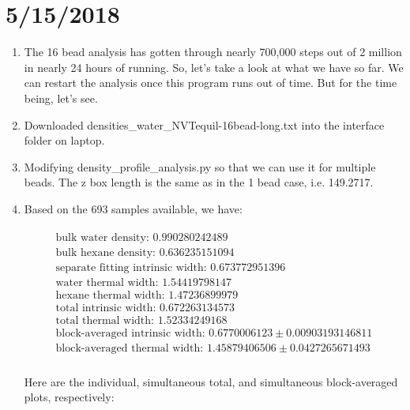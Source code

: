 \documentclass[12pt,reqno]{amsart}
\numberwithin{equation}{section}
\begin{document}
\section{5/15/2018}
\begin{enumerate}
\item The 16 bead analysis has gotten through nearly 700,000 steps out of 2 million in nearly 24 hours of running.  So, let's take a look at what we have so far.  We can restart the analysis once this program runs out of time.  But for the time being, let's see. 
\item Downloaded densities\_water\_NVTequil-16bead-long.txt into the interface folder on laptop.  
\item Modifying density\_profile\_analysis.py so that we can use it for multiple beads.  The z box length is the same as in the 1 bead case, i.e. 149.2717.   
\item Based on the 693 samples available, we have:

\begin{align}
\begin{split}
\text{bulk water density: } 0.990280242489 \\
\text{bulk hexane density: } 0.636235151094 \\
\text{separate fitting intrinsic width: } 0.673772951396 \\
\text{water thermal width: } 1.54419798147 \\
\text{hexane thermal width: } 1.47236899979 \\
\text{total intrinsic width: } 0.672263134573 \\
\text{total thermal width: } 1.52334249168 \\
\text{block-averaged intrinsic width: } 0.6770006123 \pm 0.00903193146811\\
\text{block-averaged thermal width: } 1.45879406506 \pm 0.0427265671493 \\
\end{split}
\end{align} 

Here are the individual, simultaneous total, and simultaneous block-averaged plots, respectively: 


\end{enumerate}
\end{document}
